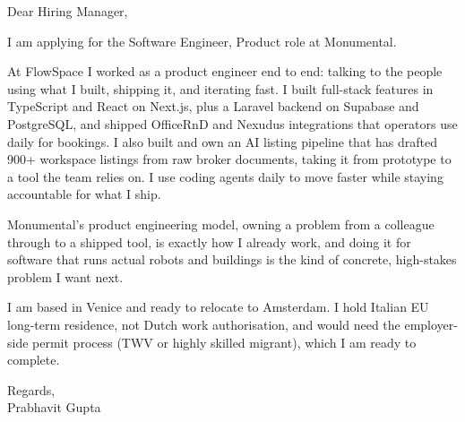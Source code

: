 \documentclass[a4paper,11pt]{article}
\begin{document}
Dear Hiring Manager,

I am applying for the Software Engineer, Product role at Monumental.

At FlowSpace I worked as a product engineer end to end: talking to the people using what I built, shipping it, and iterating fast. I built full-stack features in TypeScript and React on Next.js, plus a Laravel backend on Supabase and PostgreSQL, and shipped OfficeRnD and Nexudus integrations that operators use daily for bookings. I also built and own an AI listing pipeline that has drafted 900+ workspace listings from raw broker documents, taking it from prototype to a tool the team relies on. I use coding agents daily to move faster while staying accountable for what I ship.

Monumental's product engineering model, owning a problem from a colleague through to a shipped tool, is exactly how I already work, and doing it for software that runs actual robots and buildings is the kind of concrete, high-stakes problem I want next.

I am based in Venice and ready to relocate to Amsterdam. I hold Italian EU long-term residence, not Dutch work authorisation, and would need the employer-side permit process (TWV or highly skilled migrant), which I am ready to complete.

Regards,\\
Prabhavit Gupta
\end{document}
